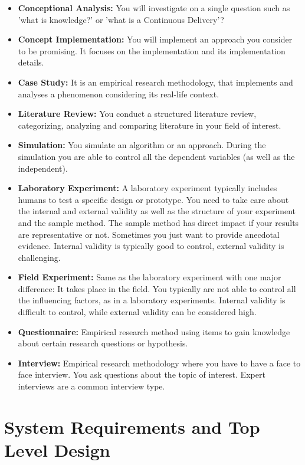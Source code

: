 \documentclass[a4paper]{article}
\begin{document}
\begin{itemize}
\item \textbf{Conceptional Analysis:} You will investigate on a single question such as 'what is knowledge?' or 'what is a Continuous Delivery'? 
\item \textbf{Concept Implementation:} You will implement an approach you consider to be promising. It focuses on the implementation and its implementation details.
\item \textbf{Case Study:} It is an empirical research methodology, that implements and analyses a phenomenon considering its real-life context.
\item \textbf{Literature Review:} You conduct a structured literature review, categorizing, analyzing and comparing literature in your field of interest. 
\item \textbf{Simulation:} You simulate an algorithm or an approach. During the simulation you are able to control all the dependent variables (as well as the independent).
\item \textbf{Laboratory Experiment:} A laboratory experiment typically includes humans to test a specific design or prototype. You need to take care about the internal and external validity as well as the structure of your experiment and the sample method. The sample method has direct impact if your results are representative or not. Sometimes you just want to provide anecdotal evidence. Internal validity is typically good to control, external validity is challenging.
\item \textbf{Field Experiment:} Same as the laboratory experiment with one major difference: It takes place in the field. You typically are not able to control all the influencing factors, as in a laboratory experiments. Internal validity is difficult to control, while external validity can be considered high. 
\item \textbf{Questionnaire:} Empirical research method using items to gain knowledge about certain research questions or hypothesis. 
\item \textbf{Interview:} Empirical research methodology where you have to have a face to face interview. You ask questions about the topic of interest. Expert interviews are a common interview type.

\end{itemize}


\section{System Requirements and Top Level Design}
\end{document}
